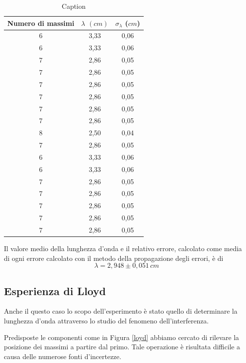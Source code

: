 \begin{table}[h!]
    \centering
    \begin{tabular}{c|cc}
    Numero di massimi & $\lambda$ $(cm)$ & $\sigma_\lambda$ ($cm$)\\
    \hline
6	&	3,33	&0,06\\
6	&	3,33	&0,06\\
7	&	2,86	&0,05\\
7	&	2,86	&0,05\\
7	&	2,86	&0,05\\
7	&	2,86	&0,05\\
7	&	2,86	&0,05\\
7	&	2,86	&0,05\\
8	&	2,50	&0,04\\
7&		2,86&	0,05\\
6	&	3,33	&0,06\\
6&		3,33&	0,06\\
7&		2,86&	0,05\\
7	&	2,86	&0,05\\
7	&	2,86	&0,05\\
7	&	2,86	&0,05\\
7	&	2,86	&0,05\\
\hline\hline
    \end{tabular}
    \caption{Caption}
    \label{tab:my_label}
\end{table}
\noindent
Il valore medio della lunghezza d'onda e il relativo errore, calcolato come media di ogni errore calcolato con il metodo della propagazione degli errori, è di 
$$
\lambda = 2,948 \pm 0,051\, cm
$$
\subsection{Esperienza di Lloyd}
Anche il questo caso lo scopo dell'esperimento è stato quello di determinare la lunghezza d'onda attraverso lo studio del fenomeno dell'interferenza.

Predisposte le componenti come in Figura \ref{loyd} abbiamo cercato di rilevare la posizione dei massimi a partire dal primo. Tale operazione è risultata difficile a causa delle numerose fonti d'incertezze. 

